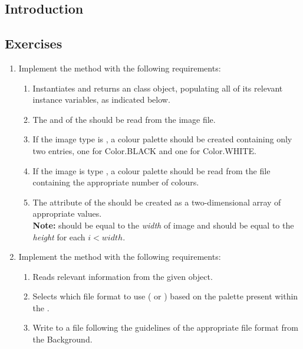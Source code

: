     \subsection{Introduction}
    \subsection{Exercises}
      \begin{enumerate}
        \item Implement the  method with the following requirements:
          \begin{enumerate}
            \item Instantiates and returns an  class object, populating all of its relevant instance variables, as indicated below.
            \item The  and  of the  should be read from the image file.              
            \item If the image type is , a colour palette should be created containing only two entries, one for Color.BLACK and one for Color.WHITE.
            \item If the image is type , a colour palette should be read from the file containing the appropriate number of colours.
            \item The  attribute of the  should be created as a two-dimensional array of appropriate values.\\
            {\small\textbf{Note:}  should be equal to the \emph{width} of image and  should be equal to the \emph{height} for each $i < width$.}
          \end{enumerate}
        \item Implement the  method with the following requirements:
          \begin{enumerate}
            \item Reads relevant information from the given  object.
            \item Selects which file format to use ( or ) based on the palette present within the .
            \item Write to a file following the guidelines of the appropriate file format from the Background.
          \end{enumerate}
      \end{enumerate}
